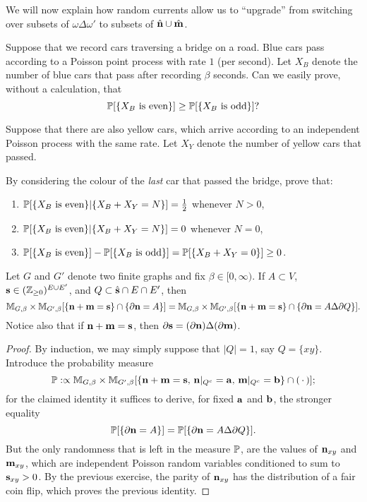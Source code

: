 We will now explain how random currents allow us to ``upgrade'' from switching
over subsets of $\omega\Delta\omega'$ to subsets of $\hat\n\cup\hat\m$.

\begin{exercise}
    Suppose that we record cars traversing a bridge on a road.
    Blue cars pass according to a Poisson point process with rate $1$ (per second).
    Let $X_B$ denote the number of blue cars that pass after recording $\beta$ seconds.
    Can we easily prove, without a calculation, that
    \[
        \P[\{\text{$X_B$ is even}\}]\geq \P[\{\text{$X_B$ is odd}\}]?
    \]

    Suppose that there are also yellow cars,
    which arrive according to an independent Poisson process with the same rate.
    Let $X_Y$ denote the number of yellow cars that passed.

    By considering the colour of the \emph{last} car that passed the bridge, prove that:
    \begin{enumerate}
        \item $\P[\{\text{$X_B$ is even}\}|\{X_B+X_Y= N \}]=\frac12$ whenever $N>0$,
        \item $\P[\{\text{$X_B$ is even}\}|\{X_B+X_Y= N \}]=0$ whenever $N=0$,
        \item $\P[\{\text{$X_B$ is even}\}]-\P[\{\text{$X_B$ is odd}\}]=\P[\{\text{$X_B+X_Y=0$}\}]\geq 0$.
    \end{enumerate}
\end{exercise}

\begin{lemma}
    \label{lem:explicit_switching_lemma}
    Let $G$ and $G'$ denote two finite graphs and fix $\beta\in[0,\infty)$.
    If $A\subset V$, $\s\in(\Z_{\geq 0})^{E\cup E'}$, and $Q\subset \hat\s\cap E\cap E'$,
    then 
    \begin{equation}
        \M_{G,\beta}\times\M_{G',\beta}
        [\{\n+\m=\s\}\cap \{\partial\n=A\}]
        =
        \M_{G,\beta}\times\M_{G',\beta}
        [\{\n+\m=\s\}\cap \{\partial\n= A\Delta\partial Q\}].
    \end{equation}
    Notice also that if $\n+\m=\s$, then $\partial\s=(\partial\n)\Delta(\partial\m)$.
\end{lemma}

\begin{proof}
    By induction, we may simply suppose that $|Q|=1$, say $Q=\{xy\}$.
    Introduce the probability measure
    \[
        \P:\propto  \M_{G,\beta}\times\M_{G',\beta}
        [\{\n+\m=\s,\,\n|_{Q^c}=\a,\,\m|_{Q^c}=\b\}\cap(\blank)];
    \]
    for the claimed identity it suffices to derive, for fixed $\a$ and $\b$, the stronger equality
    \[
        \P[\{\partial\n=A\}]=\P[\{\partial\n=A\Delta\partial Q\}].
    \]
    But the only randomness that is left in the measure $\P$,
    are the values of $\n_{xy}$ and $\m_{xy}$,
    which are independent Poisson random variables conditioned to sum to $\s_{xy}>0$.
    By the previous exercise, the parity of $\n_{xy}$ has the distribution of a fair coin flip,
    which proves the previous identity.
\end{proof}



